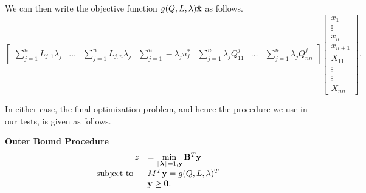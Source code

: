 %
We can then write the objective function $g(Q,L,\lambda)\hat{\mathbf{x}}$ as follows.
%
\[
  \begin{bmatrix}
    \sum\limits_{j=1}^nL_{j,1}\lambda_j &
    \dots &
    \sum\limits_{j=1}^nL_{j,n}\lambda_j &
    \sum\limits_{j=1}^n-\lambda_j u^*_j &
    \sum\limits_{j=1}^n\lambda_jQ_{11}^j &
    \dots &
    \sum\limits_{j=1}^n\lambda_jQ_{nn}^j 
  \end{bmatrix}
%
  \begin{bmatrix}
	x_1 \\ 
	\vdots \\
	x_n \\
	x_{n+1} \\
	X_{11} \\ 
	\vdots \\
	\vdots \\
	X_{nn} 
  \end{bmatrix}.%
\] 

In either case, the final optimization problem, and hence the procedure we use in our tests, is given as follows.

\medskip
\textbf{Outer Bound Procedure} 
\begin{equation}\label{eq:OPTfeasOutRelaxb}
\begin{array}{rl}
  \ z &=\min\limits_{\norm{\vlambda}=1, \vy}\vB^T\vy  \\
  \vspace*{-0.15in} \\
 \text{subject to } \ & M^T\vy = g(Q,L,\lambda)^T \\
 & \vy \geq \vzero .
\end{array}
\end{equation}










